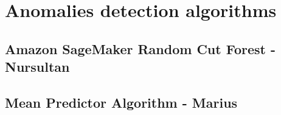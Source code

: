 \section{Anomalies detection algorithms}
        \subsection{Amazon SageMaker Random Cut Forest - Nursultan}
            
            \FloatBarrier
            
        \subsection{Mean Predictor Algorithm - Marius}
            
